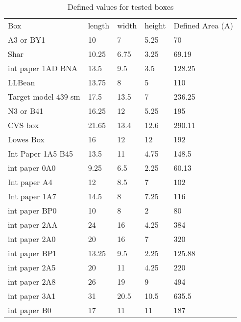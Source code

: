 \documentclass[11pt, twoside, reqno]{book}
\begin{document}
 
\FloatBarrier

\begin{table}[]
	\centering

	\label{AR1A}
	\begin{tabular}{lllll}
		Box                 & length & width & height & Defined Area (A) \\
		A3 or BY1           & 10     & 7     & 5.25   & 70               \\
		Shar                & 10.25  & 6.75  & 3.25   & 69.19            \\
		int paper 1AD BNA   & 13.5   & 9.5   & 3.5    & 128.25           \\
		LLBean              & 13.75  & 8     & 5      & 110              \\
		Target model 439 sm & 17.5   & 13.5  & 7      & 236.25           \\
		N3 or B41           & 16.25  & 12    & 5.25   & 195              \\
		CVS box             & 21.65  & 13.4  & 12.6   & 290.11           \\
		Lowes Box           & 16     & 12    & 12     & 192              \\
		Int Paper 1A5 B45   & 13.5   & 11    & 4.75   & 148.5            \\
		int paper 0A0       & 9.25   & 6.5   & 2.25   & 60.13            \\
		Int paper A4        & 12     & 8.5   & 7      & 102              \\
		Int paper 1A7       & 14.5   & 8     & 7.25   & 116              \\
		int paper BP0       & 10     & 8     & 2      & 80               \\
		int paper 2AA       & 24     & 16    & 4.25   & 384              \\
		int paper 2A0       & 20     & 16    & 7      & 320              \\
		int paper BP1       & 13.25  & 9.5   & 2.25   & 125.88           \\
		int paper 2A5       & 20     & 11    & 4.25   & 220              \\
		int paper 2A8       & 26     & 19    & 9      & 494              \\
		int paper 3A1       & 31     & 20.5  & 10.5   & 635.5            \\
		int paper B0        & 17     & 11    & 11     & 187             
	\end{tabular}
	\caption{Defined values for tested boxes}
\end{table}
\FloatBarrier
\end{document}
